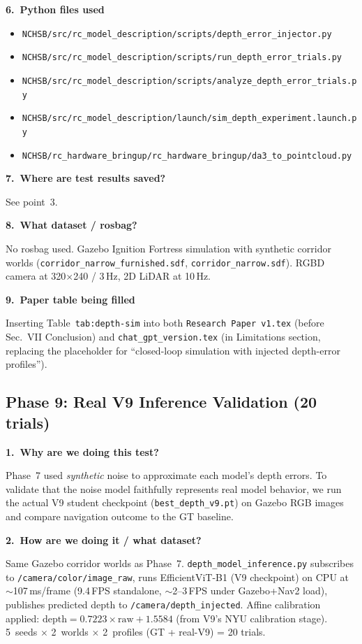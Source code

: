 \documentclass[11pt,a4paper]{article}
\begin{document}
\textbf{6.\ Python files used}

\begin{itemize}
  \item \texttt{NCHSB/src/rc\_model\_description/scripts/depth\_error\_injector.py}
  \item \texttt{NCHSB/src/rc\_model\_description/scripts/run\_depth\_error\_trials.py}
  \item \texttt{NCHSB/src/rc\_model\_description/scripts/analyze\_depth\_error\_trials.py}
  \item \texttt{NCHSB/src/rc\_model\_description/launch/sim\_depth\_experiment.launch.py}
  \item \texttt{NCHSB/rc\_hardware\_bringup/rc\_hardware\_bringup/da3\_to\_pointcloud.py}
\end{itemize}

\textbf{7.\ Where are test results saved?}

See point~3.

\textbf{8.\ What dataset / rosbag?}

No rosbag used.  Gazebo Ignition Fortress simulation with synthetic
corridor worlds (\texttt{corridor\_narrow\_furnished.sdf},
\texttt{corridor\_narrow.sdf}).  RGBD camera at 320$\times$240 / 3\,Hz,
2D LiDAR at 10\,Hz.

\textbf{9.\ Paper table being filled}

Inserting Table~\texttt{tab:depth-sim} into both
\texttt{Research Paper v1.tex} (before Sec.~VII Conclusion) and
\texttt{chat\_gpt\_version.tex} (in Limitations section, replacing
the placeholder for ``closed-loop simulation with injected
depth-error profiles'').

\subsection*{Phase 9: Real V9 Inference Validation (20 trials)}

\textbf{1.\ Why are we doing this test?}

Phase~7 used \emph{synthetic} noise to approximate each model's depth
errors.  To validate that the noise model faithfully represents real
model behavior, we run the actual V9 student checkpoint
(\texttt{best\_depth\_v9.pt}) on Gazebo RGB images and compare
navigation outcome to the GT baseline.

\textbf{2.\ How are we doing it / what dataset?}

Same Gazebo corridor worlds as Phase~7.
\texttt{depth\_model\_inference.py} subscribes to
\texttt{/camera/color/image\_raw}, runs EfficientViT-B1 (V9 checkpoint)
on CPU at $\sim$107\,ms/frame (9.4\,FPS standalone, $\sim$2--3\,FPS
under Gazebo+Nav2 load), publishes predicted depth to
\texttt{/camera/depth\_injected}.
Affine calibration applied: $\text{depth} = 0.7223 \times \text{raw} +
1.5584$ (from V9's NYU calibration stage).
5~seeds $\times$ 2~worlds $\times$ 2~profiles (GT + real-V9)
= 20 trials.
\end{document}
